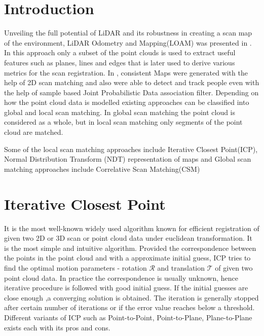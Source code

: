 \section*{Introduction}
Unveiling the full potential of LiDAR and its robustness in creating a scan map of the environment, LiDAR Odometry and Mapping(LOAM) was presented in \cite{ZhangS14}. In this approach only a subset of the point clouds is used to extract useful features such as planes, lines and edges that is later used to derive various metrics for the scan registration. In \cite{D.Hahnel}, consistent Maps were generated with the help of 2D scan matching and also were able to detect and track people even with the help of sample based Joint Probabilistic Data association filter. Depending on how the point cloud data is modelled existing approaches can be classified into global and local scan matching. In global scan matching the point cloud is considered as a whole, but in local scan matching only segments of the point cloud are matched.

Some of the local scan matching approaches include Iterative Closest Point(ICP), Normal  Distribution Transform (NDT) representation of maps and Global scan matching approaches include Correlative Scan Matching(CSM)

\section{Iterative Closest Point}
It is the most well-known widely used algorithm known for  efficient registration of given two 2D or 3D scan or point cloud data under euclidean transformation. It is the most simple and intuitive algorithm. Provided the correspondence between the points in the point cloud and with a  approximate initial guess, ICP tries to find the optimal motion parameters - rotation $\mathcal{R}$ and translation $\mathcal{T}$ of given two point cloud data. In practice the correspondence is usually unknown, hence iterative procedure is followed with good initial guess. If the initial guesses are close enough ,a converging solution is obtained. The iteration is generally stopped after certain number of iterations or if the error value reaches below a threshold. Different variants of ICP such as Point-to-Point, Point-to-Plane, Plane-to-Plane exists each with its pros and cons. 

